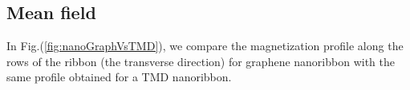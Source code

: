 \subsection{Mean field}
\label{sec:resul}
In Fig.(\ref{fig:nanoGraphVsTMD}), we compare the magnetization profile along the rows of the ribbon (the transverse direction) for graphene nanoribbon with the same profile obtained for a TMD nanoribbon.

